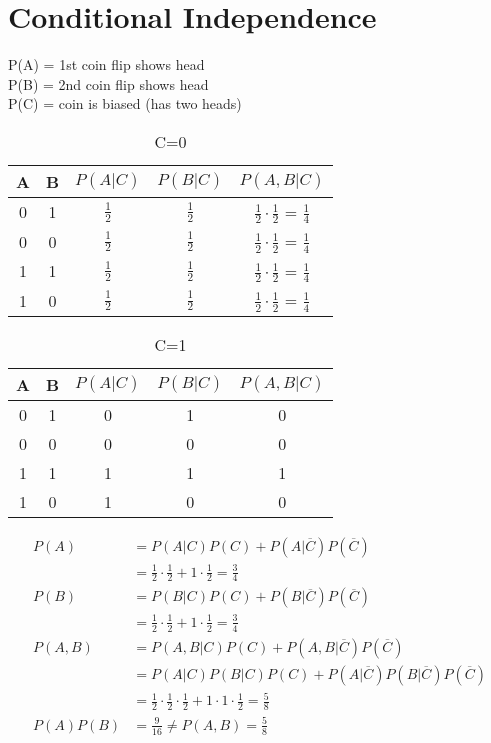 \documentclass{article}
\begin{document}
\section{Conditional Independence}

\noindent P(A) = 1st coin flip shows head\\
P(B) = 2nd coin flip shows head\\
P(C) = coin is biased (has two heads)

\begin{table}[htb]
\caption{C=0}
\centering
  \begin{tabular}{ | c | c | c| c | c|}
    \hline
    A & B & $P(A|C)$ & $P(B|C)$ & $P(A,B|C)$ \\ \hline
    0 & 1 & $\frac{1}{2}$ & $\frac{1}{2}$ & $\frac{1}{2}\cdot\frac{1}{2}$ = $\frac{1}{4}$ \\ \hline 
    0 & 0 & $\frac{1}{2}$ & $\frac{1}{2}$ & $\frac{1}{2}\cdot \frac{1}{2}$ = $\frac{1}{4}$ \\ \hline
    1 & 1 & $\frac{1}{2}$ & $\frac{1}{2}$ & $\frac{1}{2}\cdot\frac{1}{2}$ = $\frac{1}{4}$ \\ \hline
    1 & 0 & $\frac{1}{2}$ & $\frac{1}{2}$ & $\frac{1}{2}\cdot\frac{1}{2}$ = $\frac{1}{4}$ \\  \hline
  \end{tabular}
  \end{table}

\begin{table}[htb]
\caption{C=1}
\centering
  \begin{tabular}{ | c | c | c| c | c|}
    \hline
    A & B & $P(A|C)$ & $P(B|C)$ & $P(A,B|C)$ \\ \hline
    0 & 1 &0 &1 & 0 \\ \hline 
    0 & 0 &0 & 0 & 0 \\ \hline
    1 & 1 & 1 & 1 & 1 \\ \hline
    1 & 0 & 1 & 0 & 0 \\  \hline
  \end{tabular}
  \end{table}

\begin{align*}
P(A) &= P(A|C)P(C)+P(A|\overline{C})P(\overline{C}) \\&= \frac{1}{2}\cdot\frac{1}{2} + 1\cdot\frac{1}{2}=\frac{3}{4}\\
P(B) &= P(B|C)P(C)+P(B|\overline{C})P(\overline{C}) \\&= \frac{1}{2}\cdot\frac{1}{2} + 1\cdot\frac{1}{2}=\frac{3}{4}\\
P(A,B) &= P(A, B|C)P(C)+P(A, B|\overline{C})P(\overline{C}) \\&= P(A|C)P(B|C)P(C)+P(A|\overline{C})P(B|\overline{C})P(\overline{C})\\& = \frac{1}{2}\cdot \frac{1}{2}\cdot \frac{1}{2}  + 1\cdot 1\cdot \frac{1}{2}= \frac{5}{8}
\\
P(A)P(B) &= \frac{9}{16} \neq P(A,B) = \frac{5}{8}
\end{align*}
\end{document}
